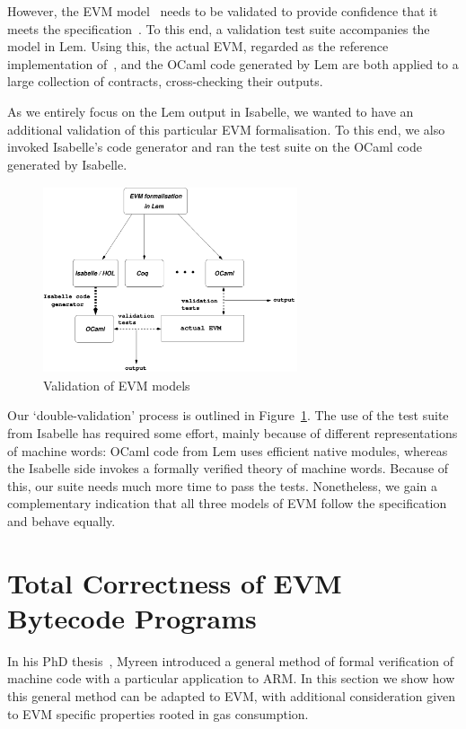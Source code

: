 \documentclass[sigplan,10pt]{acmart}\settopmatter{printfolios=true,printccs=false,printacmref=false}
\begin{document}
However, the EVM model~\cite{Yoichi} needs to be validated to provide confidence that it
meets the specification~\cite{wood2014ethereum}. 
To this end, a validation test suite accompanies
the model in Lem. Using this, the actual EVM, regarded as the reference implementation of~\cite{wood2014ethereum}, 
and the OCaml code generated by Lem %
are both applied to a large collection of contracts, cross-checking their outputs.  

As we entirely focus on the Lem output in Isabelle, we wanted to
have an additional validation of this particular EVM formalisation. 
To this end, we also invoked Isabelle's code generator and ran the test suite 
on the OCaml code generated by Isabelle.

\begin{figure}[ht!]
\centering
\includegraphics[height=5.5cm, width=7.5cm]{images/evm_lem}    
        \caption{Validation of EVM models}
\label{fig:valid}
\end{figure}

Our `double-validation' process is outlined in Figure~\ref{fig:valid}.
The use of the test suite from Isabelle has required some effort, mainly because 
of different representations of machine words: OCaml code from Lem uses efficient native modules,
whereas the Isabelle side invokes a formally verified theory of machine words.
Because of this, our suite needs much more time to pass the tests.
Nonetheless, we gain a complementary indication that all three models of EVM follow the specification
and behave equally.    
%
\section{Total Correctness of EVM Bytecode Programs}
\label{sec:corr}
In his PhD thesis~\cite{DBLP:phd/ethos/Myreen09}, Myreen introduced a general 
method of formal verification of
machine code with a particular application to ARM. In this section we show how
this general method can be adapted to EVM, with additional consideration given to
EVM specific properties rooted in gas consumption.
 
\end{document}
